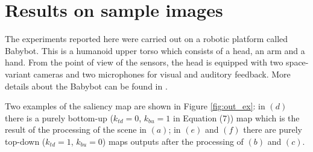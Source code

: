 \documentclass{llncs}
\begin{document}
\section{Results on sample images}
\label{sec:att_results}
The experiments reported here were carried out
on a robotic platform called Babybot. This is a
humanoid upper torso which consists of a head, an arm
and a hand. 
From the point of view of the sensors, the head is
equipped with two space-variant cameras \cite{SandiniQSM00}
and two microphones for visual and auditory feedback.
More details about the Babybot can be found in \cite{Natale04}.

Two examples of the saliency map are shown in
Figure \ref{fig:out_ex}: in $(d)$ there is a purely bottom-up ($k_{td}=0$,
$k_{bu}=1$ in Equation (7)) map which is the result of the
processing of the scene in $(a)$; in $(e)$ and $(f)$ there are purely
top-down ($k_{td}=1$, $k_{bu}=0$) maps outputs after the
processing of $(b)$ and $(c)$.


\end{document}
